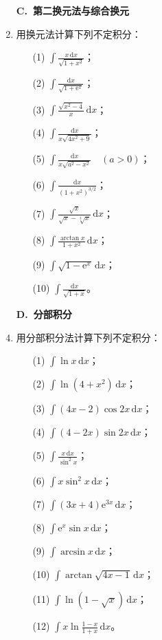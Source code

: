 \documentclass[fontset=fandol]{ctexart}
\newcommand{\dd}{\mathrm{d}}
\newcommand{\ee}{\mathrm{e}}
\begin{document}
\begin{enumerate}
\item[]\textbf{C.\ 第二换元法与综合换元}
\setcounter{enumi}{0}
\item 用换元法计算下列不定积分：
\begin{enumerate}
\item[(1)] $\displaystyle \int \frac{x\,\dd x}{\sqrt{1+x^2}}$；
\item[(2)] $\displaystyle \int \frac{\dd x}{\sqrt{1+\ee^x}}$；
\item[(3)] $\displaystyle \int \frac{\sqrt{x^2-4}}{x}\,\dd x$；
\item[(4)] $\displaystyle \int \frac{\dd x}{x\sqrt{4x^2+9}}$；
\item[(5)] $\displaystyle \int \frac{\dd x}{x\sqrt{a^2-x^2}}\quad(a>0)$；
\item[(6)] $\displaystyle \int \frac{\dd x}{(1+x^2)^{3/2}}$；
\item[(7)] $\displaystyle \int \frac{\sqrt{x}}{\sqrt{x}-\sqrt[3]{x}}\,\dd x$；
\item[(8)] $\displaystyle \int \frac{\arctan x}{1+x^2}\,\dd x$；
\item[(9)] $\displaystyle \int \sqrt{1-\ee^x}\,\dd x$；
\item[(10)] $\displaystyle \int \frac{\dd x}{\sqrt{1+x}}$。
\end{enumerate}

\item[]\textbf{D.\ 分部积分}
\setcounter{enumi}{0}
\item 用分部积分法计算下列不定积分：
\begin{enumerate}
\item[(1)] $\displaystyle \int \ln x\,\dd x$；
\item[(2)] $\displaystyle \int \ln(4+x^2)\,\dd x$；
\item[(3)] $\displaystyle \int (4x-2)\cos2x\,\dd x$；
\item[(4)] $\displaystyle \int (4-2x)\sin2x\,\dd x$；
\item[(5)] $\displaystyle \int \frac{x\,\dd x}{\sin^2x}$；
\item[(6)] $\displaystyle \int x\sin^2x\,\dd x$；
\item[(7)] $\displaystyle \int (3x+4)\ee^{3x}\,\dd x$；
\item[(8)] $\displaystyle \int \ee^x\sin x\,\dd x$；
\item[(9)] $\displaystyle \int \arcsin x\,\dd x$；
\item[(10)] $\displaystyle \int \arctan\sqrt{4x-1}\,\dd x$；
\item[(11)] $\displaystyle \int \ln(1-\sqrt{x})\,\dd x$；
\item[(12)] $\displaystyle \int x\ln\frac{1-x}{1+x}\,\dd x$。
\end{enumerate}


\end{enumerate}
\end{document}
